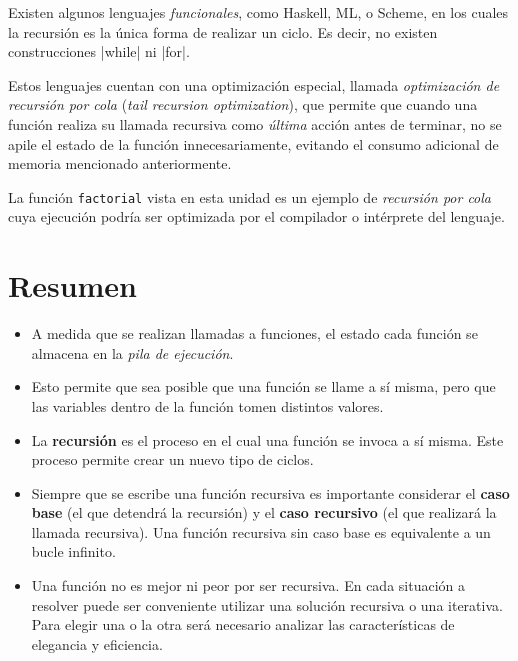 \begin{sabias_que}
Existen algunos lenguajes \emph{funcionales}, como Haskell, ML, o Scheme, en
los cuales la recursión es la única forma de realizar un ciclo.  Es
decir, no existen construcciones |while| ni |for|.

Estos lenguajes cuentan con una optimización especial, llamada
\emph{optimización de recursión por cola} (\emph{tail recursion optimization}),
que permite que cuando una función realiza su llamada recursiva como
\emph{última} acción antes de terminar, no se apile el estado de la función
innecesariamente, evitando el consumo adicional de memoria mencionado
anteriormente.

La función \lstinline!factorial! vista en esta unidad es un ejemplo de
\emph{recursión por cola} cuya ejecución podría ser optimizada por el compilador o
intérprete del lenguaje.
\end{sabias_que}

\section{Resumen}

\begin{itemize}

\item A medida que se realizan llamadas a funciones, el estado cada
función se almacena en la \emph{pila de ejecución}.

\item Esto permite que sea posible que una función se llame a sí misma,
pero que las variables dentro de la función tomen distintos valores.

\item La {\bf recursión} es el proceso en el cual una función se invoca a
sí misma.  Este proceso permite crear un nuevo tipo de ciclos.

\item Siempre que se escribe una función recursiva es importante considerar
el {\bf caso base} (el que detendrá la recursión) y el {\bf caso
recursivo} (el que realizará la llamada recursiva).  Una función recursiva
sin caso base es equivalente a un bucle infinito.

\item Una función no es mejor ni peor por ser recursiva.  En cada situación
a resolver puede ser conveniente utilizar una solución recursiva o una
iterativa.  Para elegir una o la otra será necesario analizar las
características de elegancia y eficiencia.

\end{itemize}



